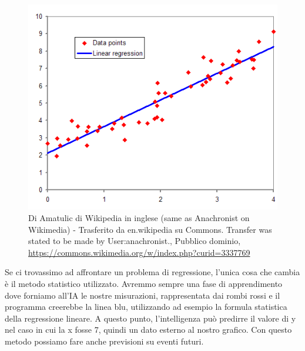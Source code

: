 \documentclass[12pt]{book} %
\begin{document}
\begin{figure}
  \centering
  \includegraphics[width=0.95\linewidth]{images/Libro-img047.png}
  \begin{minipage}{\linewidth}
    \caption{Di Amatulic di Wikipedia in inglese (same as
Anachronist on Wikimedia) - Trasferito da en.wikipedia su Commons. Transfer was stated to be made by User:anachronist.,
Pubblico dominio, \protect\url{https://commons.wikimedia.org/w/index.php?curid=3337769} }
  \end{minipage}
\end{figure}

Se ci trovassimo ad affrontare un problema di regressione, l'unica cosa che cambia è il metodo
statistico utilizzato. Avremmo sempre una fase di apprendimento dove forniamo all'IA le nostre
misurazioni, rappresentata dai rombi rossi e il programma creerebbe la linea blu, utilizzando ad esempio la formula
statistica della regressione lineare. A questo punto, l'intelligenza può predirre il valore di y
nel caso in cui la x fosse 7, quindi un dato esterno al nostro grafico. Con questo metodo possiamo fare anche
previsioni su eventi futuri.
\end{document}
